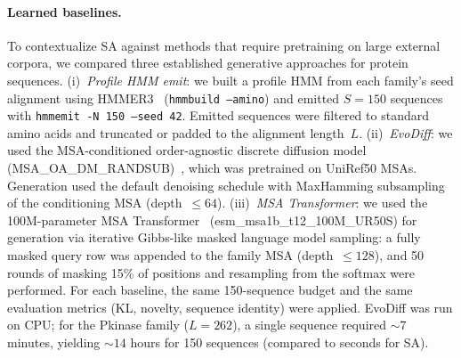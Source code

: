\paragraph{Learned baselines.}
To contextualize SA against methods that require pretraining on large external corpora, we compared three established generative approaches for protein sequences. (i)~\emph{Profile HMM emit}: we built a profile HMM from each family's seed alignment using HMMER3~\cite{hmmer3} (\texttt{hmmbuild --amino}) and emitted $S{=}150$ sequences with \texttt{hmmemit -N 150 --seed 42}. Emitted sequences were filtered to standard amino acids and truncated or padded to the alignment length~$L$. (ii)~\emph{EvoDiff}: we used the MSA-conditioned order-agnostic discrete diffusion model (MSA\_OA\_DM\_RANDSUB)~\cite{alamdariProteinGeneration2023}, which was pretrained on UniRef50 MSAs. Generation used the default denoising schedule with MaxHamming subsampling of the conditioning MSA (depth~$\leq 64$). (iii)~\emph{MSA Transformer}: we used the 100M-parameter MSA Transformer~\cite{raoMSATransformer2021} (esm\_msa1b\_t12\_100M\_UR50S) for generation via iterative Gibbs-like masked language model sampling: a fully masked query row was appended to the family MSA (depth~$\leq 128$), and 50 rounds of masking 15\% of positions and resampling from the softmax were performed. For each baseline, the same 150-sequence budget and the same evaluation metrics (KL, novelty, sequence identity) were applied. EvoDiff was run on CPU; for the Pkinase family ($L{=}262$), a single sequence required ${\sim}7$ minutes, yielding ${\sim}14$ hours for 150 sequences (compared to seconds for SA).

